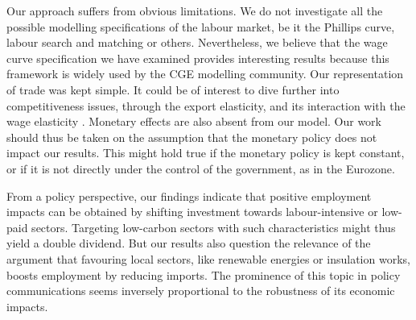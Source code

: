 Our approach suffers from obvious limitations. We do not investigate all the possible modelling specifications of the labour market, be it the Phillips curve, labour search and matching or others. Nevertheless, we believe that the wage curve specification we have examined provides interesting results because this framework is widely used by the CGE modelling community.
Our representation of trade was kept simple. It could be of interest to dive further into competitiveness issues, through the export elasticity, and its interaction with the wage elasticity \citep{Combet2016}. Monetary effects are also absent from our model. Our work should thus be taken on the assumption that the monetary policy does not impact our results. This might hold true if the monetary policy is kept constant, or if it is not directly under the control of the government, as in the Eurozone.

From a policy perspective, our findings indicate that positive employment impacts can be obtained by shifting investment towards labour-intensive or low-paid sectors. Targeting low-carbon sectors with such characteristics might thus yield a double dividend.
But our results also question the relevance of the argument that favouring local sectors, like renewable energies or insulation works, boosts employment by reducing imports. The prominence of this topic in policy communications seems inversely proportional to the robustness of its economic impacts. 
